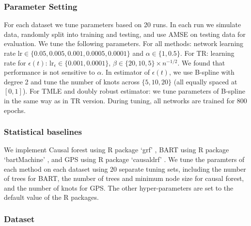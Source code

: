 \subsubsection{Parameter Setting}
For each dataset we tune parameters based on 20 runs. In each run we simulate data, randomly split into training and testing, and use AMSE on testing data for evaluation.
We tune the following parameters. 
For all methods: network learning rate $\text{lr}\in\{0.05,0.005,0.001,0.0005,0.0001\}$ and
$\alpha\in\{1,0.5\}$.
For TR: learning rate for $\epsilon(t)$: $\text{lr}_{\epsilon}\in\{0.001,0.0001\}$, $\beta\in\{20,10,5\}\times n^{-1/2}$. 
We found that performance is not sensitive to $\alpha$. 
In estimator of $\epsilon(t)$, we use B-spline with degree 2 and tune the number of knots across $\{5,10,20\}$ (all equally spaced at $[0,1]$).
For TMLE and doubly robust estimator: we tune parameters of B-spline in the same way as in TR version. 
During tuning, all networks are trained for 800 epochs.

\subsubsection{Statistical baselines}
We implement Causal forest  \citep{wager2018estimation} using R package `grf' \citep{tibshirani2018package}, BART using R package `bartMachine' \citep{kapelner2016package}, and GPS using R package `causaldrf' \citep{galagate2015package}. 
We tune the paramters of each method on each dataset using 20 separate tuning sets, including the number of trees for BART, the number of trees and minimum node size for causal forest, and the number of knots for GPS. The other hyper-parameters are set to the default value of the R packages.



\subsubsection{Dataset}
